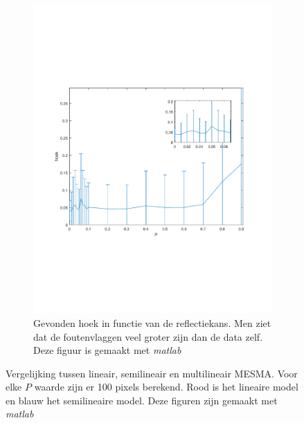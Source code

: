 \documentclass[12pt]{report}
\begin{document}
\begin{figure}
\begin{subfigure}[b]{0.5\textwidth}
\includegraphics[width=\textwidth,trim=0 200 0 175 cm]{PMC_AAM_10_100_angle.pdf}
\caption{Gevonden hoek in functie van de reflectiekans. Men ziet dat de foutenvlaggen veel groter zijn dan de data zelf. Deze figuur is gemaakt met \textit{matlab}\cite{matlab} \label{fig:Ahoek}}
\end{subfigure}
\caption{Vergelijking tussen lineair, semilineair en multilineair MESMA. Voor elke $P$ waarde zijn er 100 pixels berekend. Rood is het lineaire model en blauw het semilineaire model. Deze figuren zijn gemaakt met \textit{matlab}\cite{matlab}\label{fig:Ab100}}
\end{figure}
\end{document}

